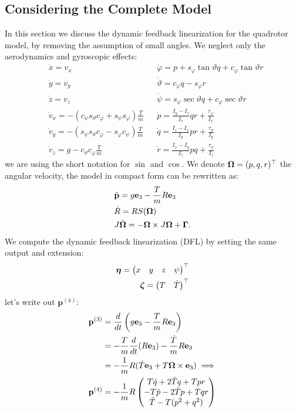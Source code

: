 \documentclass[10pt, a4paper]{report}
\begin{document}
\subsection{Considering the Complete Model}
In this section we discuss the dynamic feedback linearization for the quadrotor model, by removing the assumption of small angles. We neglect only the aerodynamics and gyroscopic effects:
\begin{align}\label{full_model}
& \dot{x} = v_x & &\dot{\varphi} = p + s_\varphi \tan\vartheta q + c_\varphi \tan\vartheta r \\
& \dot{y} = v_y & &\dot{\vartheta} = c_\varphi q - s_\varphi r \\
& \dot{z} = v_z & &\dot{\psi} = s_\varphi \sec\vartheta q + c_\varphi \sec\vartheta r \\
& \dot{v}_x =  - (c_\psi s_\vartheta c_\varphi + s_\psi s_\varphi) \frac{T}{m} & & 
\dot{p} =  \frac{I_y - I_z}{I_x} q r + \frac{\tau_\varphi}{I_x}\label{dot_p} \\
& \dot{v}_y =  - (s_\psi s_\vartheta c_\varphi - s_\varphi c_\psi) \frac{T}{m} & & \dot{q} =    \frac{I_z - I_x}{I_y} p r + \frac{\tau_\vartheta}{I_y}\label{dot_q} \\
& \dot{v}_z =  g - c_\vartheta c_\varphi\frac{T}{m} 
& & \dot{r} = \frac{I_x - I_y}{I_z} p q + \frac{\tau_\psi}{I_z}
\end{align}
we are using the short notation for $\sin$ and $\cos$. We denote ${\boldsymbol{\Omega}}=(p,q,r)^\top$ the angular velocity, the model in compact form can be rewritten as:\begin{align}
    &\ddot{\mathbf p}=g\mathbf e_3-\frac{T}{m}R\mathbf e_3\\ 
    &\dot R=RS({\boldsymbol{\Omega}})\\ 
    &J\dot{{\boldsymbol{\Omega}}}=-{\boldsymbol{\Omega}}\times J{\boldsymbol{\Omega}}+\boldsymbol{\Gamma}.
\end{align}
We compute the dynamic feedback linearization (DFL) by setting the same output and extension:\begin{align}
    \boldsymbol{\eta}=\begin{pmatrix}
        x&y&z&\psi
    \end{pmatrix}^\top\\ 
    {\boldsymbol{\zeta}}=\begin{pmatrix}
        T&\dot T 
    \end{pmatrix}^\top
\end{align}
let's write out $\mathbf p^{(4)}$:\begin{align}
    \mathbf p^{(3)}&=\frac{d}{dt}\left(g\mathbf e_3-\frac{T}{m}R\mathbf e_3\right)\\
    &=-\frac{T}{m}\frac{d}{dt}(R\mathbf e_3)-\frac{\dot T}{m}R\mathbf e_3\\
    &=-\frac{1}{m}R(\dot T\mathbf e_3+T{\boldsymbol{\Omega}}\times\mathbf e_3)\implies \\ 
    \mathbf p^{(4)}&=-\frac{1}{m}R\begin{pmatrix}
        T\dot q+2\dot T q+ Tpr\\ 
        -T\dot p-2\dot Tp+Tqr\\ 
        \ddot T-T(p^2+q^2)
    \end{pmatrix}
\end{align}
\end{document}
